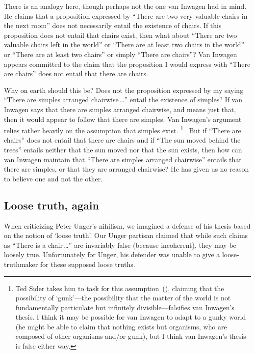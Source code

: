 \documentclass[11pt]{article}
\begin{document}
\begin{spacing}{1.5}
There is an analogy here, though perhaps not the one van Inwagen had in mind. He claims that a proposition expressed by ``There are two very valuable chairs in the next room'' does not necessarily entail the existence of chairs. If this proposition does not entail that chairs exist, then what about ``There are two valuable chairs left in the world'' or ``There are at least two chairs in the world'' or ``There are at least two chairs'' or simply ``There are chairs''? Van Inwagen appears committed to the claim that the proposition I would express with ``There are chairs'' does not entail that there are chairs.

Why on earth should this be? Does not the proposition expressed by my saying ``There are simples arranged chairwise\,\ldots '' entail the existence of simples? If van Inwagen says that there are simples arranged chairwise, and means just that, then it would appear to follow that there are simples. Van Inwagen's argument relies rather heavily on the assumption that simples exist.%
%
\footnote{Ted Sider takes him to task for this assumption~(\citeyear{sider1993}), claiming that the possibility of `gunk'---the possibility that the matter of the world is not fundamentally particulate but infinitely divisible---falsifies van Inwagen's thesis. I think it may be possible for van Inwagen to adapt to a gunky world (he might be able to claim that nothing exists but organisms, who are composed of other organisms and/or gunk), but I think van Inwagen's thesis is false either way.}
%
\ But if ``There are chairs'' does not entail that there are chairs and if ``The sun moved behind the trees'' entails neither that the sun moved nor that the sun exists, then how can van Inwagen maintain that ``There are simples arranged chairwise'' entails that there are simples, or that they are arranged chairwise? He has given us no reason to believe one and not the other.

\subsection{Loose truth, again}
When criticizing Peter Unger's nihilism, we imagined a defense of his thesis based on the notion of `loose truth'. Our Unger partisan claimed that while such claims as ``There is a chair\,\ldots '' are invariably false (because incoherent), they may be loosely true. Unfortunately for Unger, his defender was unable to give a loose-truthmaker for these supposed loose truths.


\end{spacing}
\end{document}
